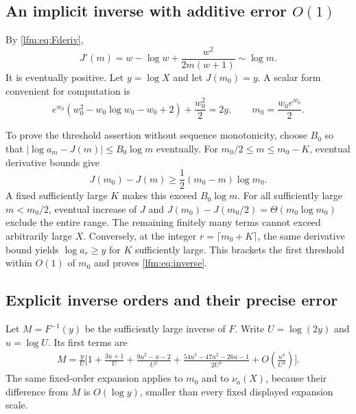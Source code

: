 \documentclass[11pt,letterpaper]{article}
\theoremstyle{remark}\newtheorem{remark}[theorem]{Remark}
\begin{document}
\subsection{An implicit inverse with additive error \texorpdfstring{$O(1)$}{O(1)}}
By \eqref{lfm:eq:Fderiv},
\begin{equation}
 J'(m)=w-\log w+\frac{w^2}{2m(w+1)}\sim\log m.\label{lfm:eq:Jprime}
\end{equation}
It is eventually positive. Let $y=\log X$ and let $J(m_0)=y$. A scalar form convenient for computation is
\begin{equation}
 e^{w_0}(w_0^2-w_0\log w_0-w_0+2)+\frac{w_0^2}{2}=2y,
 \qquad m_0=\frac{w_0e^{w_0}}2.\label{lfm:eq:scalarJ}
\end{equation}

To prove the threshold assertion without sequence monotonicity, choose $B_0$ so that
$|\log a_m-J(m)|\le B_0\log m$ eventually. For $m_0/2\le m\le m_0-K$, eventual derivative bounds give
\[
 J(m_0)-J(m)\ge\frac12(m_0-m)\log m_0.
\]
A fixed sufficiently large $K$ makes this exceed $B_0\log m$. For all sufficiently large $m<m_0/2$, eventual increase of $J$ and
$J(m_0)-J(m_0/2)=\Theta(m_0\log m_0)$ exclude the entire range. The remaining finitely many terms cannot exceed arbitrarily large $X$. Conversely, at the integer $r=\lceil m_0+K\rceil$, the same derivative bound yields $\log a_r\ge y$ for $K$ sufficiently large. This brackets the first threshold within $O(1)$ of $m_0$ and proves \eqref{lfm:eq:inverse}.

\subsection{Explicit inverse orders and their precise error}
Let $M=F^{-1}(y)$ be the sufficiently large inverse of $F$. Write $U=\log(2y)$ and $u=\log U$. Its first terms are
\begin{align}
 M=\frac yU\bigg[1+\frac{3u+1}{U}
 +\frac{9u^2-u-2}{U^2}
 +\frac{54u^3-47u^2-26u-1}{2U^3}
 +O\left(\frac{u^4}{U^4}\right)\bigg].\label{lfm:eq:inverse-series}
\end{align}
The same fixed-order expansion applies to $m_0$ and to $\nu_a(X)$, because their difference from $M$ is $O(\log y)$, smaller than every fixed displayed expansion scale.
\end{document}
